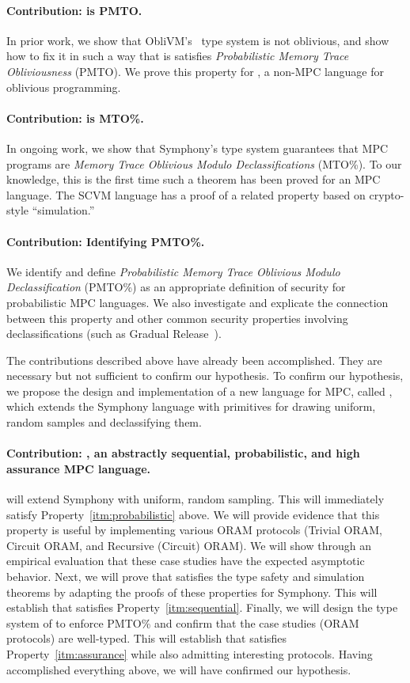 \paragraph{Contribution: \obliv is PMTO.} In prior work, we show that ObliVM's~\cite{todo} type system is not oblivious,
and show how to fix it in such a way that is satisfies \emph{Probabilistic Memory Trace Obliviousness} (PMTO).
We prove this property for \obliv, a non-MPC language for oblivious programming.

\paragraph{Contribution: \mpc is MTO\%.} In ongoing work, we show that Symphony's type system guarantees that MPC programs are
\emph{Memory Trace Oblivious Modulo Declassifications} (MTO\%). To our knowledge, this is the first time such a theorem has been
proved for an MPC language. The SCVM language has a proof of a related property based on crypto-style ``simulation.''

\paragraph{Contribution: Identifying PMTO\%.} We identify and define \emph{Probabilistic Memory Trace Oblivious Modulo Declassification}
(PMTO\%) as an appropriate definition of security for probabilistic MPC languages. We also investigate and explicate the connection between
this property and other common security properties involving declassifications (such as Gradual Release~\cite{todo}).

The contributions described above have already been accomplished. They are necessary but not sufficient to confirm our hypothesis.
To confirm our hypothesis, we propose the design and implementation of a new language for MPC, called \lang, which extends the
Symphony language with primitives for drawing uniform, random samples and declassifying them.

\paragraph{Contribution: \lang, an abstractly sequential, probabilistic, and high assurance MPC language.}
\lang will extend Symphony with uniform, random sampling. This will immediately satisfy
Property~\ref{itm:probabilistic} above. We will provide evidence that this property is useful by
implementing various ORAM protocols (Trivial ORAM, Circuit ORAM, and Recursive (Circuit) ORAM). We will show through
an empirical evaluation that these case studies have the expected asymptotic behavior. Next, we will prove that \lang satisfies
the type safety and simulation theorems by adapting the proofs of these properties for Symphony. This will establish
that \lang satisfies Property~\ref{itm:sequential}.
Finally, we will design the type system of \lang to enforce PMTO\% and confirm that the case studies (ORAM protocols) are well-typed.
This will establish that \lang satisfies Property~\ref{itm:assurance} while also admitting interesting protocols. Having
accomplished everything above, we will have confirmed our hypothesis.

